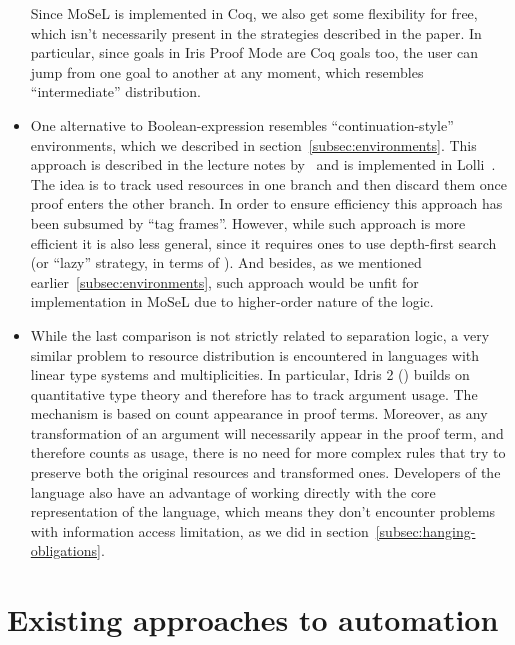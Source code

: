 \begin{itemize}
  Since MoSeL is implemented in Coq, we also get some flexibility for free, which isn't necessarily present in the strategies described in the paper.
  In particular, since goals in Iris Proof Mode are Coq goals too, the user can jump from one goal to another at any moment, which resembles ``intermediate'' distribution.
\item One alternative to Boolean-expression resembles ``continuation-style'' environments, which we described in section~\ref{subsec:environments}.
  This approach is described in the lecture notes by~\citet{pfenningLogicProgrammingLecture2007} and is implemented in Lolli~\cite{LolliLinearLogic}.
  The idea is to track used resources in one branch and then discard them once proof enters the other branch.
  In order to ensure efficiency this approach has been subsumed by ``tag frames''\cite{hodasTagFrameSystemResource2002, lopezImplementingEfficientResource2004}.
  However, while such approach is more efficient it is also less general, since it requires ones to use depth-first search (or ``lazy'' strategy, in terms of \citet{harlandResourceDistributionBooleanConstraints2003}).
  And besides, as we mentioned earlier~\ref{subsec:environments}, such approach would be unfit for implementation in MoSeL due to higher-order nature of the logic.
\item While the last comparison is not strictly related to separation logic, a very similar problem to resource distribution is encountered in languages with linear type systems and multiplicities.
  In particular, Idris 2 (\cite{MultiplicitiesIdris2Documentation}) builds on quantitative type theory and therefore has to track argument usage.
  The mechanism is based on count appearance in proof terms.
  Moreover, as any transformation of an argument will necessarily appear in the proof term, and therefore counts as usage, there is no need for more complex rules that try to preserve both the original resources and transformed ones.
  Developers of the language also have an advantage of working directly with the core representation of the language, which means they don't encounter problems with information access limitation, as we did in section~\ref{subsec:hanging-obligations}.
\end{itemize}

\section{Existing approaches to automation}
\label{sec:exist-appr-autom}

